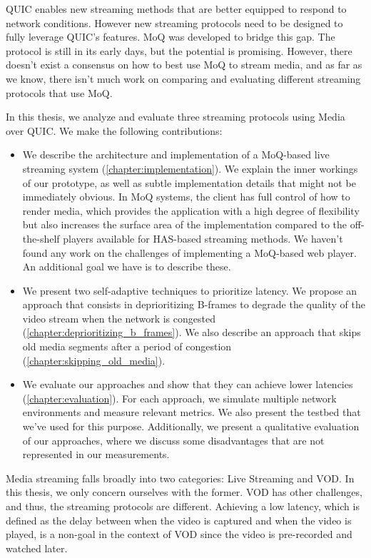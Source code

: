 QUIC enables new streaming methods that are better equipped to respond to network conditions. However new streaming protocols need to be designed to fully leverage QUIC's features. \ac{MoQ} was developed to bridge this gap. The protocol is still in its early days, but the potential is promising. However, there doesn't exist a consensus on how to best use \ac{MoQ} to stream media, and as far as we know, there isn't much work on comparing and evaluating different streaming protocols that use \ac{MoQ}.

In this thesis, we analyze and evaluate three streaming protocols using Media over QUIC. We make the following contributions:
\begin{itemize}
    \item We describe the architecture and implementation of a MoQ-based live streaming system (\autoref{chapter:implementation}). We explain the inner workings of our prototype, as well as subtle implementation details that might not be immediately obvious. In \ac{MoQ} systems, the client has full control of how to render media, which provides the application with a high degree of flexibility but also increases the surface area of the implementation compared to the off-the-shelf players available for \ac{HAS}-based streaming methods. %
    We haven't found any work on the challenges of implementing a \ac{MoQ}-based web player. An additional goal we have is to describe these.
    \item We present two self-adaptive techniques to prioritize latency. We propose an approach that consists in deprioritizing B-frames to degrade the quality of the video stream when the network is congested (\autoref{chapter:deprioritizing_b_frames}). We also describe an approach that skips old media segments after a period of congestion (\autoref{chapter:skipping_old_media}).
    \item We evaluate our approaches and show that they can achieve lower latencies (\autoref{chapter:evaluation}). For each approach, we simulate multiple network environments and measure relevant metrics. We also present the testbed that we've used for this purpose. Additionally, we present a qualitative evaluation of our approaches, where we discuss some disadvantages that are not represented in our measurements.
\end{itemize}

Media streaming falls broadly into two categories: Live Streaming and \ac{VOD}. In this thesis, we only concern ourselves with the former. \ac{VOD} has other challenges, and thus, the streaming protocols are different. Achieving a low latency, which is defined as the delay between when the video is captured and when the video is played, is a non-goal in the context of \ac{VOD} since the video is pre-recorded and watched later.

